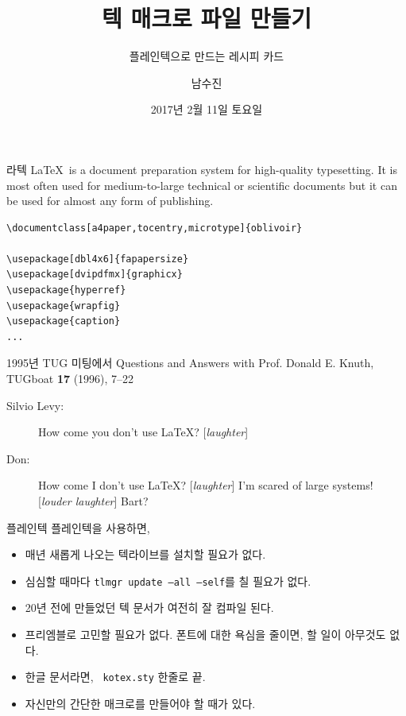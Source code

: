 \documentclass{beamer}
\title{텍 매크로 파일 만들기}
\subtitle{플레인텍으로 만드는 레시피 카드}
\date{2017년 2월 11일 토요일}
\author{남수진}
\institute{
  2017 한국텍학회 학술대회 및 정기총회 \\
  동국대학교 법학관 B253호}
\begin{document}
\maketitle

%
\begin{frame}[fragile]{라텍}
  \LaTeX\ is a document preparation system for high-quality typesetting.
  It is most often used for \alert{medium-to-large technical or scientific
    documents} {\scriptsize but it can be used for almost any form of
    publishing.}

  \begin{Verbatim}[fontsize=\small]
\documentclass[a4paper,tocentry,microtype]{oblivoir}

\usepackage[dbl4x6]{fapapersize}
\usepackage[dvipdfmx]{graphicx}
\usepackage{hyperref}
\usepackage{wrapfig}
\usepackage{caption}
...
  \end{Verbatim}
\end{frame}


%
\begin{frame}{1995년 TUG 미팅에서}
  Questions and Answers with Prof. Donald E. Knuth, 
  TUGboat \textbf{17} (1996), 7--22
  \begin{description}
  \item[Silvio Levy:] How come you don't use \LaTeX? [\textsl{laughter}]
  \item[Don:] How come I don't use \LaTeX? [\textsl{laughter}]
    I'm scared of \alert{large systems!} [\textsl{louder laughter\/}]
    Bart?
  \end{description}
\end{frame}


%
\begin{frame}{플레인텍}
  플레인텍을 사용하면,
  \begin{itemize}
  \item 매년 새롭게 나오는 텍라이브를 설치할 필요가 없다.
  \item 심심할 때마다 {\small\alert{\texttt{tlmgr update --all --self}}}를
    칠 필요가 없다.
  \item 20년 전에 만들었던 텍 문서가 여전히 잘 컴파일 된다.
  \item 프리엠블로 고민할 필요가 없다. 폰트에 대한 욕심을 줄이면, 할 일이 아무것도 없다.
  \item 한글 문서라면, {\small\alert{\texttt{\string\ kotex.sty}}}
    한줄로 끝.
  \item {\scriptsize 자신만의 간단한 매크로를 만들어야 할 때가 있다.}
  \end{itemize}
\end{frame}
\end{document}
